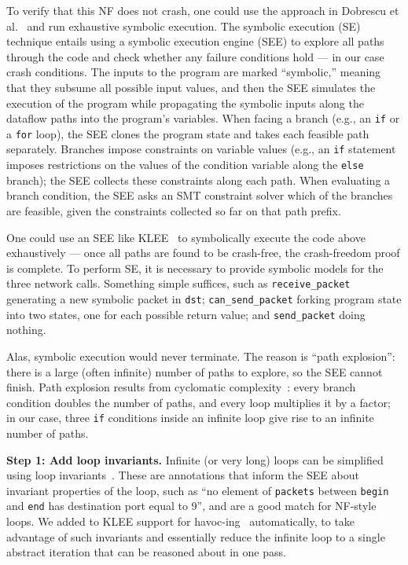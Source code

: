 \documentclass[letterpaper,twocolumn,10pt]{article}
\newcommand{\code}[1]{\lstinline{#1}}
\begin{document}
To verify that this NF does not crash, one could use the approach in Dobrescu et al.~\cite{dobrescu2014software} and run exhaustive symbolic execution. The symbolic execution (SE) technique entails using a symbolic execution engine (SEE) to explore all paths through the code and check whether any failure conditions hold --- in our case crash conditions. The inputs to the program are marked ``symbolic,'' meaning that they subsume all possible input values, and then the SEE simulates the execution of the program while propagating the symbolic inputs along the dataflow paths into the program's variables. When facing a branch (e.g., an \code{if} or a \code{for} loop), the SEE clones the program state and takes each feasible path separately. Branches impose constraints on variable values (e.g., an \code{if} statement imposes restrictions on the values of the condition variable along the \code{else} branch); the SEE collects these constraints along each path. When evaluating a branch condition, the SEE asks an SMT constraint solver which of the branches are feasible, given the constraints collected so far on that path prefix.

One could use an SEE like KLEE~\cite{cadar2008klee} to symbolically execute the code above exhaustively --- once all paths are found to be crash-free, the crash-freedom proof is complete. To perform SE, it is necessary to provide symbolic models for the three network calls. Something simple suffices, such as \code{receive_packet} generating a new symbolic packet in \code{dst}; \code{can_send_packet} forking program state into two states, one for each possible return value; and \code{send_packet} doing nothing. 

Alas, symbolic execution would never terminate. The reason is ``path explosion'': there is a large (often infinite) number of paths to explore, so the SEE cannot finish.  Path explosion results from cyclomatic complexity~\cite{mccabe:cyclomatic}: every branch condition doubles the number of paths, and every loop multiplies it by a factor; in our case, three \code{if} conditions inside an infinite loop give rise to an infinite number of paths. 

{\bf Step 1: Add loop invariants.} Infinite (or very long) loops can be simplified using loop invariants~\cite[\S~2.1]{cormen2009introduction}. These are annotations that inform the SEE about invariant properties of the loop, such as ``no element of \code{packets} between \code{begin} and \code{end} has destination port equal to 9'', and are a good match for NF-style loops.  We added to KLEE support for havoc-ing~\cite{boogie} automatically, to take advantage of such invariants and essentially reduce the infinite loop to a single abstract iteration that can be reasoned about in one pass.
 
\end{document}
